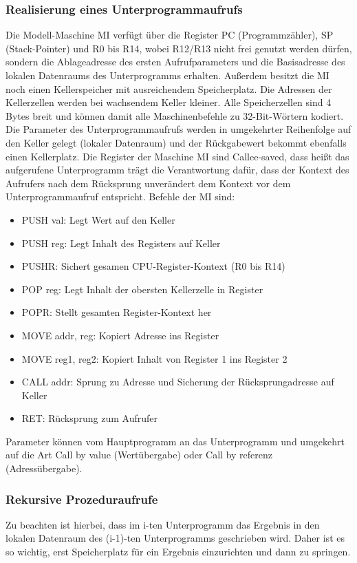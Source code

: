 \documentclass{article}
\begin{document}
\subsubsection{Realisierung eines Unterprogrammaufrufs}
    Die Modell-Maschine MI verfügt über die Register PC (Programmzähler), SP (Stack-Pointer) und R0 bis R14, wobei R12/R13 nicht frei genutzt werden dürfen, sondern die Ablageadresse des ersten Aufrufparameters und die Basisadresse des lokalen Datenraums des Unterprogramms erhalten. Außerdem besitzt die MI noch einen Kellerspeicher mit ausreichendem Speicherplatz. Die Adressen der Kellerzellen werden bei wachsendem Keller kleiner. Alle Speicherzellen sind 4 Bytes breit und können damit alle Maschinenbefehle zu 32-Bit-Wörtern kodiert.\newline
    Die Parameter des Unterprogrammaufrufs werden in umgekehrter Reihenfolge auf den Keller gelegt (lokaler Datenraum) und der Rückgabewert bekommt ebenfalls einen Kellerplatz. Die Register der Maschine MI sind Callee-saved, dass heißt das aufgerufene Unterprogramm trägt die Verantwortung dafür, dass der Kontext des Aufrufers nach dem Rücksprung unverändert dem Kontext vor dem Unterprogrammaufruf entspricht.\newline
    Befehle der MI sind:
    \begin{itemize}
        \item PUSH val: Legt Wert auf den Keller
        \item PUSH reg: Legt Inhalt des Registers auf Keller
        \item PUSHR: Sichert gesamen CPU-Register-Kontext (R0 bis R14)
        \item POP reg: Legt Inhalt der obersten Kellerzelle in Register
        \item POPR: Stellt gesamten Register-Kontext her
        \item MOVE addr, reg: Kopiert Adresse ins Register
        \item MOVE reg1, reg2: Kopiert Inhalt von Register 1 ins Register 2
        \item CALL addr: Sprung zu Adresse und Sicherung der Rücksprungadresse auf Keller
        \item RET: Rücksprung zum Aufrufer
    \end{itemize}
    Parameter können vom Hauptprogramm an das Unterprogramm und umgekehrt auf die Art Call by value (Wertübergabe) oder Call by referenz (Adressübergabe).
\subsubsection{Rekursive Prozeduraufrufe}
    Zu beachten ist hierbei, dass im i-ten Unterprogramm das Ergebnis in den lokalen Datenraum des (i-1)-ten Unterprogramms geschrieben wird. Daher ist es so wichtig, erst Speicherplatz für ein Ergebnis einzurichten und dann zu springen.
\end{document}
